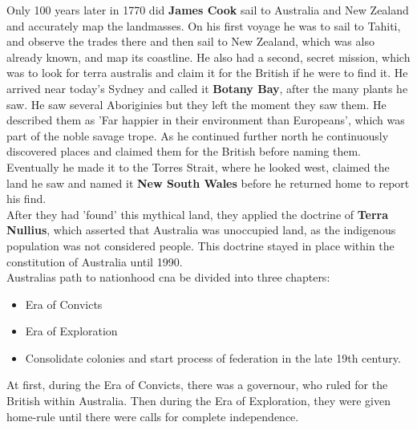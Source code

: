 \documentclass{article}
\begin{document}
	Only 100 years later in 1770 did \textbf{James Cook} sail to Australia and New Zealand and accurately map the landmasses. On his first voyage he was to sail to Tahiti, and observe the trades there and then sail to New Zealand, which was also already known, and map its coastline. He also had a second, secret mission, which was to look for terra australis and claim it for the British if he were to find it. He arrived near today's Sydney and called it \textbf{Botany Bay}, after the many plants he saw. He saw several Aboriginies but they left the moment they saw them. He described them as 'Far happier in their environment than Europeans', which was part of the noble savage trope. As he continued further north he continuously discovered places and claimed them for the British before naming them. Eventually he made it to the Torres Strait, where he looked west, claimed the land he saw and named it \textbf{New South Wales} before he returned home to report his find. \\
	After they had 'found' this mythical land, they applied the doctrine of \textbf{Terra Nullius}, which asserted that Australia was unoccupied land, as the indigenous population was not considered people. This doctrine stayed in place within the constitution of Australia until 1990. \\
	Australias path to nationhood cna be divided into three chapters:
	\begin{itemize}
		\item{Era of Convicts}
		\item{Era of Exploration}
		\item{Consolidate colonies and start process of federation in the late 19th century.}
	\end{itemize}
	At first, during the Era of Convicts, there was a governour, who ruled for the British within Australia. Then during the Era of Exploration, they were given home-rule until there were calls for complete independence. \\
\end{document}
